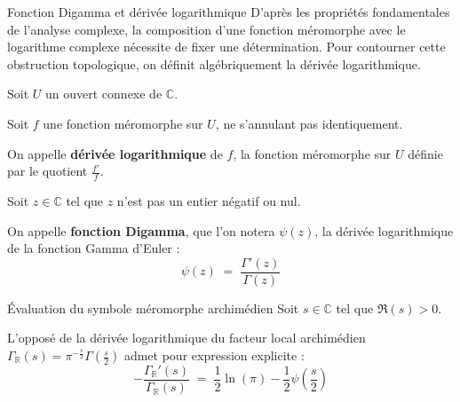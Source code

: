 \documentclass[Riemann_Hypothesis.tex]{subfiles}
\begin{document}
\begin{DefNef}[label=df:FonctionDigamma_fr]{Fonction Digamma et dérivée logarithmique}
    D'après les propriétés fondamentales de l'analyse complexe, la composition d'une fonction méromorphe avec le logarithme complexe nécessite de fixer une détermination. Pour contourner cette obstruction topologique, on définit algébriquement la dérivée logarithmique. \par
    Soit $U$ un ouvert connexe de $\mathbb{C}$. \par
    Soit $f$ une fonction méromorphe sur $U$, ne s'annulant pas identiquement. \par
    On appelle \textbf{dérivée logarithmique} de $f$, la fonction méromorphe sur $U$ définie par le quotient $\frac{f'}{f}$. \par
    Soit $z \in \mathbb{C}$ tel que $z$ n'est pas un entier négatif ou nul. \par
    On appelle \textbf{fonction Digamma}, que l'on notera $\psi(z)$, la dérivée logarithmique de la fonction Gamma d'Euler :
    \begin{equation*}
        \psi(z) \;=\; \frac{\Gamma'(z)}{\Gamma(z)}
    \end{equation*}
\end{DefNef}

\begin{proposition}[label=pr:CalculDeriveeLogArchimedienne_fr]{Évaluation du symbole méromorphe archimédien}
    Soit $s \in \mathbb{C}$ tel que $\Re(s) > 0$. \par
    L'opposé de la dérivée logarithmique du facteur local archimédien $\Gamma_{\mathbb{R}}(s) = \pi^{-\frac{s}{2}} \Gamma\left(\frac{s}{2}\right)$ admet pour expression explicite :
    \begin{equation*}
        -\frac{\Gamma_{\mathbb{R}}'(s)}{\Gamma_{\mathbb{R}}(s)} \;=\; \frac{1}{2}\ln(\pi) - \frac{1}{2}\psi\left(\frac{s}{2}\right)
    \end{equation*}
\end{proposition}
\end{document}
